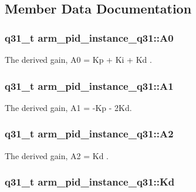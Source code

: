 \subsection{Member Data Documentation}
\hypertarget{structarm__pid__instance__q31_aa5332635ce9c7078cdb4c1ecf442eadd}{
\subsubsection[{A0}]{\setlength{\rightskip}{0pt plus 5cm}q31\-\_\-t arm\-\_\-pid\-\_\-instance\-\_\-q31\-::\-A0}}\label{structarm__pid__instance__q31_aa5332635ce9c7078cdb4c1ecf442eadd}
The derived gain, A0 = Kp + Ki + Kd . \hypertarget{structarm__pid__instance__q31_a2f7492bd6fb92fae5e2de7fbbec39b0e}{
\subsubsection[{A1}]{\setlength{\rightskip}{0pt plus 5cm}q31\-\_\-t arm\-\_\-pid\-\_\-instance\-\_\-q31\-::\-A1}}\label{structarm__pid__instance__q31_a2f7492bd6fb92fae5e2de7fbbec39b0e}
The derived gain, A1 = -\/\-Kp -\/ 2\-Kd. \hypertarget{structarm__pid__instance__q31_a3e34537c53af4f9ad7bfffa4dff27c82}{
\subsubsection[{A2}]{\setlength{\rightskip}{0pt plus 5cm}q31\-\_\-t arm\-\_\-pid\-\_\-instance\-\_\-q31\-::\-A2}}\label{structarm__pid__instance__q31_a3e34537c53af4f9ad7bfffa4dff27c82}
The derived gain, A2 = Kd . \hypertarget{structarm__pid__instance__q31_aab4ff371d14441df501f1169f71cbd17}{
\subsubsection[{Kd}]{\setlength{\rightskip}{0pt plus 5cm}q31\-\_\-t arm\-\_\-pid\-\_\-instance\-\_\-q31\-::\-Kd}}\label{structarm__pid__instance__q31_aab4ff371d14441df501f1169f71cbd17}
